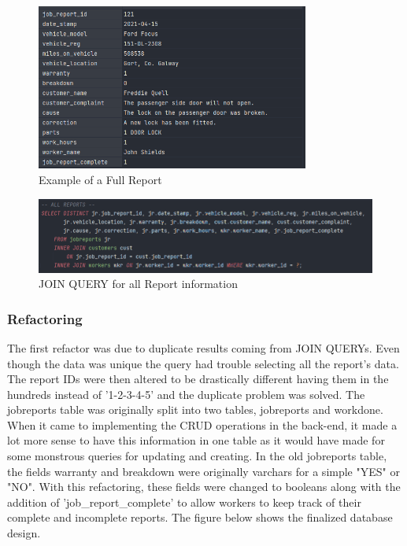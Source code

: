\begin{figure}[H]
    \caption{Example of a Full Report}
    \label{image:dbReport}
    \centering
    \includegraphics[width=0.8\textwidth]{images/database/job_report.png}
\end{figure}

\begin{figure}[H]
    \caption{JOIN QUERY  for all Report information}
    \label{image:join}
    \centering
    \includegraphics[width=1.0\textwidth]{images/database/raw_mysql_join.png}
\end{figure}

\subsubsection{Refactoring}
The first refactor was due to duplicate results coming from JOIN QUERYs. Even though the data was unique the query had trouble selecting all the report's data. The report IDs were then altered to be drastically different having them in the hundreds instead of '1-2-3-4-5' and the duplicate problem was solved. The jobreports table was originally split into two tables, jobreports and workdone. When it came to implementing the CRUD operations in the back-end, it made a lot more sense to have this information in one table as it would have made for some monstrous queries for updating and creating. In the old jobreports table, the fields warranty and breakdown were originally varchars for a simple "YES" or "NO". With this refactoring, these fields were changed to booleans along with the addition of 'job\_report\_complete' to allow workers to keep track of their complete and incomplete reports. The figure below shows the finalized database design.

